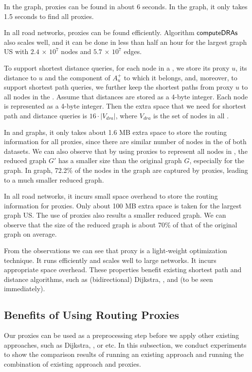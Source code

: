 In the \dblp graph, proxies can be found in about 6 seconds. In the \dblpone graph, it only takes 1.5 seconds to find all proxies.

In all road networks, proxies can be found efficiently. Algorithm ${\mathsf{computeDRAs}}$ also scales well, and it can be done in less than half an hour for the largest graph US with $2.4$ $\times$ $10^7$ nodes and $5.7$ $\times$ $10^7$ edges.

To support shortest distance queries, for each node in a \dra, we store its proxy $u$, its distance to $u$ and the component of $A^{+}_u$ to which it belongs, and, moreover, to support shortest path queries, we further keep the shortest paths from proxy $u$ to all nodes in the \dra. Assume that distances are stored as a 4-byte integer. Each node is represented as a 4-byte integer. Then the extra space that we need for shortest path and distance queries is $16\cdot |V_{dra}|$, where $V_{dra}$ is the set of nodes in all \dras.

In \dblp and \dblpone graphs, it only takes about 1.6 MB extra space to store the routing information for all proxies, since there are similar number of nodes in the \dras of both datasets. We can also observe that by using proxies to represent all nodes in \dras, the reduced graph $G'$ has a smaller size than the original graph $G$, especially for the \dblpone graph. In \dblpone graph, 72.2\% of the nodes in the graph are captured by proxies, leading to a much smaller reduced graph.

In all road networks, it incurs small space overhead to store the routing information for proxies. Only about 100 MB extra space is taken for the largest graph US. The use of proxies also results a smaller reduced graph. We can observe that the size of the reduced graph is about 70\% of that of the original graph on average.


From the observations we can see that proxy is a light-weight optimization technique. It runs efficiently and scales well to large networks. It incurs appropriate space overhead. These properties benefit existing shortest  path and distance algorithms, such as (bidirectional) Dijkstra, \arcflag , \tnr and \ah (to be seen immediately).

\subsection{Benefits of Using Routing Proxies}
Our proxies can be used as a preprocessing step before we apply other existing approaches, such as Dijkstra, \arcflag, \tnr or \ah etc. In this subsection, we conduct experiments to show the comparison results of running an existing approach and running the combination of existing approach and proxies.



